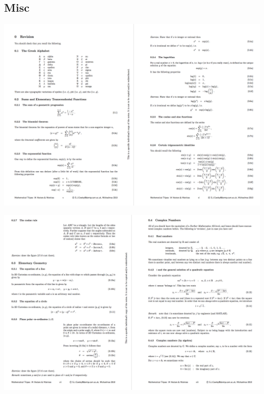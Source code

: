 \subsection{Misc}
\begin{mdframed}
\includegraphics[width=400pt]{img/misc--cambridge-1a-vectors-and-matrices-revision-1.png}
\end{mdframed}
\begin{mdframed}
\includegraphics[width=400pt]{img/misc--cambridge-1a-vectors-and-matrices-revision-2.png}
\end{mdframed}
